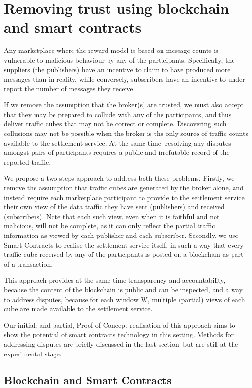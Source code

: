 \documentclass[conference]{IEEEtran}
\begin{document}
\section{Removing trust using blockchain and smart contracts}

Any marketplace where the reward model is based on message counts is vulnerable to malicious behaviour by any of the participants. Specifically, the suppliers (the publishers) have an incentive to claim to have produced more messages than in reality, while conversely, subscribers have an incentive to under-report the number of messages they receive.

If we remove the assumption that the broker(s) are trusted, we must also accept that they may be prepared to collude with any of the participants, and thus deliver traffic cubes that may not be correct or complete.
Discovering such collusions may not be possible when the broker is the only source of traffic counts available to the settlement service.  At the same time, resolving any disputes amongst pairs of participants requires a public and irrefutable record of the reported traffic.

We propose a two-steps approach to address both these problems.
Firstly, we remove the assumption that traffic cubes are generated by the broker alone, and instead require each marketplace participant to provide to the settlement service their own view of the data traffic they have sent (publishers) and received (subscribers).
Note that each such view, even when it is faithful and not malicious, will not be complete, as it can only reflect the partial traffic information as viewed by each publisher and each subscriber.
Secondly, we use Smart Contracts to realise the settlement service itself, in such a way that every traffic cube received by any of the participants is posted on a blockchain as part of a transaction.

This  approach provides at the same time transparency and accountability, because the content of the blockchain is public and can be inspected, and a way to address disputes, because for each window W, multiple (partial) views of each cube are made available to the settlement service.

Our initial, and partial, Proof of Concept realisation of this approach aims to show the potential of smart contracts technology in this setting. Methods for addressing disputes are briefly discussed in the last section, but are still at the experimental stage.


\subsection{Blockchain and Smart Contracts}
\end{document}
